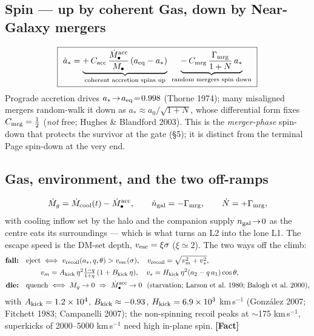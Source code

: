 \documentclass[11pt]{article}
\newcommand{\Fact}{\textbf{\textcolor{green!45!black}{[Fact]}}}
\newcommand{\Mbh}{M_{\bullet}}
\begin{document}
\subsection{Spin --- up by coherent Gas, down by Near-Galaxy mergers}
\begin{equation}
\boxed{\ \dot a_\ast=\underbrace{+\,C_{\rm acc}\,\frac{\dot\Mbh^{\rm acc}}{\Mbh}\,(a_{\rm eq}-a_\ast)}_{\text{coherent accretion spins up}}\ \underbrace{-\,C_{\rm mrg}\,\frac{\Gamma_{\rm mrg}}{1+N}\,a_\ast}_{\text{random mergers spin down}}\ }
\label{eq:spin}
\end{equation}
Prograde accretion drives $a_\ast\!\to\!a_{\rm eq}\!=\!0.998$ (Thorne 1974); many misaligned mergers random-walk it down as $a_\ast\!\approx\!a_0/\sqrt{1+N}$, whose differential form fixes $C_{\rm mrg}=\tfrac12$ (\emph{not} free; Hughes \& Blandford 2003). This is the \emph{merger-phase} spin-down that protects the survivor at the gate (\S5); it is distinct from the terminal Page spin-down at the very end.

\subsection{Gas, environment, and the two off-ramps}
\begin{equation}
\dot M_g=\dot M_{\rm cool}(t)-\dot\Mbh^{\rm acc},\qquad
\dot n_{\rm gal}=-\Gamma_{\rm mrg},\qquad \dot N=+\Gamma_{\rm mrg},
\label{eq:gasenv}
\end{equation}
with cooling inflow set by the halo and the companion supply $n_{\rm gal}\!\to\!0$ as the centre eats its surroundings --- which is what turns an L2 into the lone L1. The escape speed is the DM-set depth, $v_{\rm esc}=\xi\sigma$ ($\xi\!\simeq\!2$). The two ways off the climb:
\begin{align}
\text{\bf fall:}\quad & \text{eject}\iff v_{\rm recoil}(a_\ast,q,\theta)>v_{\rm esc}(\sigma),\quad v_{\rm recoil}=\sqrt{v_m^2+v_s^2},\\
&\qquad v_m=A_{\rm kick}\,\eta^2\tfrac{1-q}{1+q}\,(1+B_{\rm kick}\,\eta),\quad v_s=H_{\rm kick}\,\eta^2(a_2-q\,a_1)\cos\theta,\notag\\
\text{\bf die:}\quad & \text{quench}\iff M_g\to0\ \Rightarrow\ \dot\Mbh^{\rm acc}\to0\ \ (\text{starvation; Larson et al.\ 1980; Balogh et al.\ 2000}),
\end{align}
with $A_{\rm kick}=1.2\times10^4$, $B_{\rm kick}\approx-0.93$, $H_{\rm kick}=6.9\times10^3$ km\,s$^{-1}$ (Gonz\'alez 2007; Fitchett 1983; Campanelli 2007); the non-spinning recoil peaks at $\sim$175 km\,s$^{-1}$, superkicks of 2000--5000 km\,s$^{-1}$ need high in-plane spin. \Fact
\end{document}
